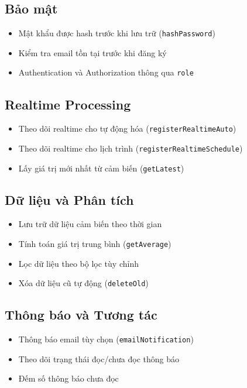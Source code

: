 \documentclass[12pt,a4paper]{article}
\begin{document}
\subsection{Bảo mật}
\begin{itemize}
    \item Mật khẩu được hash trước khi lưu trữ (\texttt{hashPassword})
    \item Kiểm tra email tồn tại trước khi đăng ký
    \item Authentication và Authorization thông qua \texttt{role}
\end{itemize}

\subsection{Realtime Processing}
\begin{itemize}
    \item Theo dõi realtime cho tự động hóa (\texttt{registerRealtimeAuto})
    \item Theo dõi realtime cho lịch trình (\texttt{registerRealtimeSchedule})
    \item Lấy giá trị mới nhất từ cảm biến (\texttt{getLatest})
\end{itemize}

\subsection{Dữ liệu và Phân tích}
\begin{itemize}
    \item Lưu trữ dữ liệu cảm biến theo thời gian
    \item Tính toán giá trị trung bình (\texttt{getAverage})
    \item Lọc dữ liệu theo bộ lọc tùy chỉnh
    \item Xóa dữ liệu cũ tự động (\texttt{deleteOld})
\end{itemize}

\subsection{Thông báo và Tương tác}
\begin{itemize}
    \item Thông báo email tùy chọn (\texttt{emailNotification})
    \item Theo dõi trạng thái đọc/chưa đọc thông báo
    \item Đếm số thông báo chưa đọc
\end{itemize}
\end{document}
